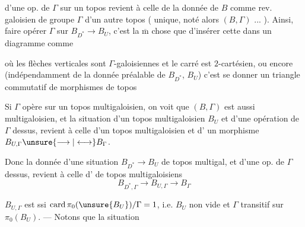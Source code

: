  d'une op. de $\Gamma$ sur un topos  revient
à celle de la donnée de $B$ comme
rev. galoisien de groupe $\Gamma$ d'un
autre topos ( unique, noté alors
$(B,\Gamma)$ ... ). Ainsi, faire opérer
 $\Gamma$ sur $B_{D^*}\longrightarrow B_U$, c'est
la $\overline{\mathrm m}$ chose que d'insérer cette
  dans un diagramme comme


 où les flèches verticales sont $\Gamma$-galoisiennes
et le carré est $2$-cartésien, ou encore
(indépendamment de la donnée préalable
de $B_{D^*}$, $B_U$) c'est se donner un
triangle  commutatif de morphismes
de topos


Si $\Gamma$ opère sur un topos multigaloisien,
on voit que $(B,\Gamma)$ est aussi
multigaloisien, et la situation d'un
topos multigaloisien $B_U$ et d'une
opération de $\Gamma$ dessus, revient à celle
d'un topos multigaloisien  et d'
un morphisme $B_{U,\Gamma}\unsure{\longrightarrow|\longleftrightarrow}B_\Gamma$.

Donc la donnée d'une situation
$B_{D^*}\longrightarrow B_U$ de topos multigal,
et d'une op. de $\Gamma$ dessus,
revient  à celle d'
de topos multigaloisiens
\[
 B_{D^*,\Gamma}\longrightarrow B_{U,\Gamma}\longrightarrow B_\Gamma
\]

$B_{U,\Gamma}$ est  ssi $\operatorname{card}\pi_0(\unsure{B_U})/\Gamma=1$,
i.e. $B_U$ non vide et $\Gamma$ transitif sur
$\pi_0(B_U)$. --- Notons que la situation

